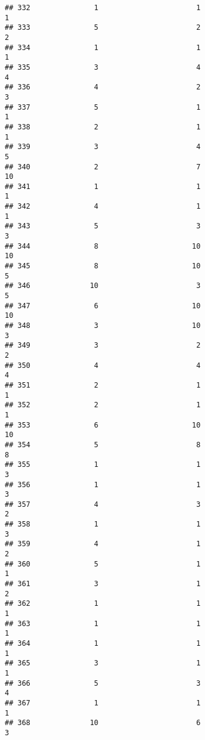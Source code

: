 \documentclass[
]{article}
\begin{document}
\begin{verbatim}
## 332               1                       1                        1
## 333               5                       2                        2
## 334               1                       1                        1
## 335               3                       4                        4
## 336               4                       2                        3
## 337               5                       1                        1
## 338               2                       1                        1
## 339               3                       4                        5
## 340               2                       7                       10
## 341               1                       1                        1
## 342               4                       1                        1
## 343               5                       3                        3
## 344               8                      10                       10
## 345               8                      10                        5
## 346              10                       3                        5
## 347               6                      10                       10
## 348               3                      10                        3
## 349               3                       2                        2
## 350               4                       4                        4
## 351               2                       1                        1
## 352               2                       1                        1
## 353               6                      10                       10
## 354               5                       8                        8
## 355               1                       1                        3
## 356               1                       1                        3
## 357               4                       3                        2
## 358               1                       1                        3
## 359               4                       1                        2
## 360               5                       1                        1
## 361               3                       1                        2
## 362               1                       1                        1
## 363               1                       1                        1
## 364               1                       1                        1
## 365               3                       1                        1
## 366               5                       3                        4
## 367               1                       1                        1
## 368              10                       6                        3

\end{verbatim}
\end{document}
